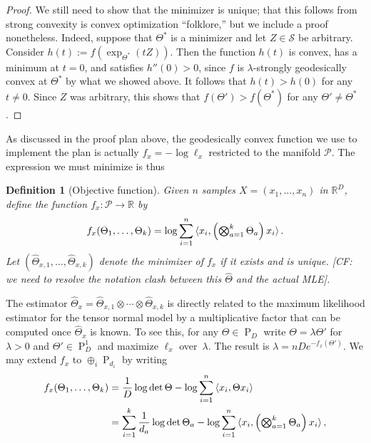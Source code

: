 \documentclass{article}
\newtheorem{definition}{Definition}
\newcommand{\R}{{\mathbb{R}}}
\newcommand{\ot}{\otimes}
\newcommand\PD{\operatorname{P}}
\newcommand\Sym{\mathcal{S}}
\newcommand\SPD{\mathcal{P}}
\newcommand\samp{x}
\newcommand\rv{X}
\newcommand{\CF}[1]{{\color{purple}[CF: #1]}}
\begin{document}
\begin{proof}

We still need to show that the minimizer is unique; that this follows from strong convexity is convex optimization ``folklore,'' but we include a proof nonetheless. Indeed, suppose that $\Theta^*$ is a minimizer and let $Z\in \Sym$ be arbitrary.
Consider $h(t) := f(\exp_{\Theta^*}(tZ))$.
Then the function $h(t)$ is convex, has a minimum at $t=0$, and satisfies $h''(0) > 0$, since $f$ is $\lambda$-strongly geodesically convex at $\Theta^*$ by what we showed above.
It follows that $h(t) > h(0)$ for any $t\neq0$.
Since $Z$ was arbitrary, this shows that $f(\Theta') > f(\Theta^*)$ for any $\Theta'\neq\Theta^*$.
\end{proof}


As discussed in the proof plan above, the geodesically convex function we use to implement the plan is actually $f_x = - \log \ell_x$ restricted to the manifold $\SPD$. The expression we must minimize is thus
 \begin{definition}[Objective function]\label{dfn:function}
Given $n$ samples $\rv = (\samp_1, \dots, \samp_n)$ in $\R^D$, define the function $f_{\samp}\colon \SPD \to \R$ by
\begin{align}\label{eq:projective-likelihood}
  f_{\samp}(\Theta_1,\dots,\Theta_k) = \log \sum_{i=1}^n \braket{\samp_i, \left( \textstyle \bigotimes_{a=1}^k \Theta_a \right) \samp_i}.
\end{align}
Let $(\widehat{\Theta}_{\samp,1}, \dots, \widehat{\Theta}_{\samp,k})$ denote the minimizer of $f_{\samp}$ if it exists and is unique. \CF{we need to resolve the notation clash between this $\widehat{\Theta}$ and the actual MLE}.
\end{definition}

The estimator $\widehat{\Theta}_{\samp} = \widehat{\Theta}_{\samp,1} \ot \cdots \ot \widehat{\Theta}_{\samp,k}$ is directly related to the maximum likelihood estimator for the tensor normal model by a multiplicative factor that can be computed once $\widehat{\Theta}_\samp$ is known. To see this, for any $\Theta \in \PD_D$ write $\Theta = \lambda \Theta'$ for $\lambda>0$ and $\Theta'\in\PD_D^1$ and maximize $\ell_\samp$ over~$\lambda$.
The result is $\lambda = n D e^{- f_\samp(\Theta')}$. We may extend $f_x$ to $\oplus_i \PD_{d_i}$ by writing 
\begin{align}
  f_{\samp}(\Theta_1,\dots,\Theta_k) &=  \frac1D\log\det \Theta - \log \sum_{i=1}^n \braket{\samp_i, \Theta \samp_i} \nonumber\\
  &= \sum_{i=1}^k \frac1{d_a} \log \det \Theta_a - \log \sum_{i=1}^n \braket{\samp_i, \left( \textstyle \bigotimes_{a=1}^k \Theta_a \right) \samp_i},\label{eq:f extension}
\end{align}
\end{document}
